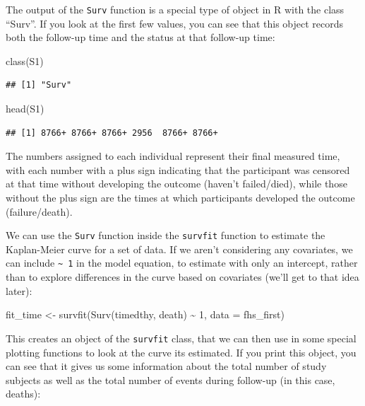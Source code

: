 \documentclass[
]{book}
\newenvironment{Shaded}{\begin{snugshade}}{\end{snugshade}}
\newcommand{\AttributeTok}[1]{\textcolor[rgb]{0.77,0.63,0.00}{#1}}
\newcommand{\DecValTok}[1]{\textcolor[rgb]{0.00,0.00,0.81}{#1}}
\newcommand{\FunctionTok}[1]{\textcolor[rgb]{0.00,0.00,0.00}{#1}}
\newcommand{\NormalTok}[1]{#1}
\newcommand{\OtherTok}[1]{\textcolor[rgb]{0.56,0.35,0.01}{#1}}
\newcommand{\SpecialCharTok}[1]{\textcolor[rgb]{0.00,0.00,0.00}{#1}}
\begin{document}
The output of the \texttt{Surv} function is a special type of object in R with the class ``Surv''. If you look at the first few values, you can see that this object records both the follow-up time and the status at that follow-up time:

\begin{Shaded}
\begin{Highlighting}[]
\FunctionTok{class}\NormalTok{(S1)}
\end{Highlighting}
\end{Shaded}

\begin{verbatim}
## [1] "Surv"
\end{verbatim}

\begin{Shaded}
\begin{Highlighting}[]
\FunctionTok{head}\NormalTok{(S1)}
\end{Highlighting}
\end{Shaded}

\begin{verbatim}
## [1] 8766+ 8766+ 8766+ 2956  8766+ 8766+
\end{verbatim}

The numbers assigned to each individual represent their final measured time, with each number with a plus sign indicating that the participant was censored at that time without developing the outcome (haven't failed/died), while those without the plus sign are the times at which participants developed the outcome (failure/death).

We can use the \texttt{Surv} function inside the \texttt{survfit} function to estimate the Kaplan-Meier curve for a set of data. If we aren't considering any covariates, we can include \texttt{\textasciitilde{}\ 1} in the model equation, to estimate with only an intercept, rather than to explore differences in the curve based on covariates (we'll get to that idea later):

\begin{Shaded}
\begin{Highlighting}[]
\NormalTok{fit\_time }\OtherTok{\textless{}{-}} \FunctionTok{survfit}\NormalTok{(}\FunctionTok{Surv}\NormalTok{(timedthy, death) }\SpecialCharTok{\textasciitilde{}} \DecValTok{1}\NormalTok{, }\AttributeTok{data =}\NormalTok{ fhs\_first)}
\end{Highlighting}
\end{Shaded}

This creates an object of the \texttt{survfit} class, that we can then use in some special plotting functions to look at the curve its estimated. If you print this object, you can see that it gives us some information about the total number of study subjects as well as the total number of events during follow-up (in this case, deaths):
\end{document}
